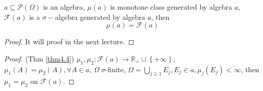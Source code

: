 \begin{lemma}
	$ a \subseteq \mathcal{P}\left(\Omega\right) $ is an algebra, $\mu \left( a \right)$ is monotone class generated by algebra $ a $, $ \mathcal{F}\left(a\right) $ is a $ \sigma- $algebra generated by algebra $ a $, then
	\begin{equation}
	\mu \left( a \right) = \mathcal{F}\left( a \right)
	\label{eq4.56}
	\end{equation}
	\label{lem4.1}
\end{lemma}
\begin{proof}
	It will proof in the next lecture.
\end{proof}

\begin{proof}(Thm \ref{thm4.4})
	${\mu _1},{\mu _2}:\mathcal{F}\left( a \right) \to {\mathbb{R}_ + } \cup \left\{ { + \infty } \right\}$, ${\mu _1}\left( A \right) = {\mu _2}\left( A \right),\forall A \in a$, $\Omega \;\sigma $-finite, $\Omega  = \bigcup\limits_{j \geqslant 1} {{E_j}} ,{E_j} \in a,{\mu _j}\left( {{E_j}} \right) < \infty $, then ${\mu _1} = {\mu _2}$ on $ \mathcal{F}(a). $
	

\end{proof}
